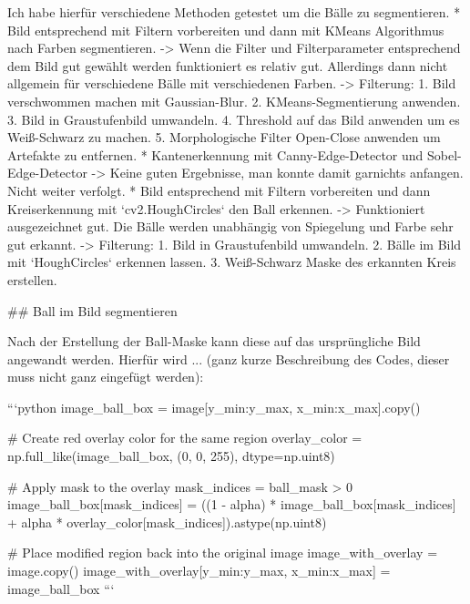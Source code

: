 Ich habe hierfür verschiedene Methoden getestet um die Bälle zu segmentieren.
* Bild entsprechend mit Filtern vorbereiten und dann mit KMeans Algorithmus nach Farben segmentieren.
    -> Wenn die Filter und Filterparameter entsprechend dem Bild gut gewählt werden funktioniert es relativ gut. Allerdings dann nicht allgemein für verschiedene Bälle mit verschiedenen Farben.
    -> Filterung:
        1. Bild verschwommen machen mit Gaussian-Blur.
        2. KMeans-Segmentierung anwenden.
        3. Bild in Graustufenbild umwandeln.
        4. Threshold auf das Bild anwenden um es Weiß-Schwarz zu machen.
        5. Morphologische Filter Open-Close anwenden um Artefakte zu entfernen.
* Kantenerkennung mit Canny-Edge-Detector und Sobel-Edge-Detector
    -> Keine guten Ergebnisse, man konnte damit garnichts anfangen. Nicht weiter verfolgt.
* Bild entsprechend mit Filtern vorbereiten und dann Kreiserkennung mit `cv2.HoughCircles` den Ball erkennen.
    -> Funktioniert ausgezeichnet gut. Die Bälle werden unabhängig von Spiegelung und Farbe sehr gut erkannt.
    -> Filterung:
        1. Bild in Graustufenbild umwandeln.
        2. Bälle im Bild mit `HoughCircles` erkennen lassen.
        3. Weiß-Schwarz Maske des erkannten Kreis erstellen.



## Ball im Bild segmentieren

Nach der Erstellung der Ball-Maske kann diese auf das ursprüngliche Bild angewandt werden. 
Hierfür wird ... (ganz kurze Beschreibung des Codes, dieser muss nicht ganz eingefügt werden):

```python
image_ball_box = image[y_min:y_max, x_min:x_max].copy()

# Create red overlay color for the same region
overlay_color = np.full_like(image_ball_box, (0, 0, 255), dtype=np.uint8)

# Apply mask to the overlay
mask_indices = ball_mask > 0
image_ball_box[mask_indices] = ((1 - alpha) * image_ball_box[mask_indices] + alpha * overlay_color[mask_indices]).astype(np.uint8)

# Place modified region back into the original image
image_with_overlay = image.copy()
image_with_overlay[y_min:y_max, x_min:x_max] = image_ball_box
```






